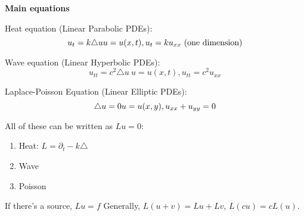 \documentclass[main.tex]{subfiles}
\begin{document}
\textbf{Main equations}

Heat equation (Linear Parabolic PDEs):
\begin{equation}
    \label{eq:heat}
    u_t = k\triangle u \\
    u = u(x, t), u_t = ku_{xx} \textrm{ (one dimension)}
\end{equation}

Wave equation (Linear Hyperbolic PDEs):
\begin{equation}
   \label{eq:wave}
   u_{tt} = c^2\triangle u \
   u = u(x, t), u_{tt} = c^2u_{xx}
\end{equation}

Laplace-Poisson Equation (Linear Elliptic PDEs):
\begin{equation}
   \label{eq:laplace-poisson}
   \triangle u = 0 \\
   u = u(x, y), u_{xx} + u_{yy} = 0
\end{equation}

All of these can be written as $Lu = 0$:
\begin{enumerate}
    \item Heat: $L = \partial_t - k\triangle$
    \item Wave
    \item Poisson
\end{enumerate}
If there's a source, $Lu = f$
Generally, $L(u + v) = Lu + Lv$, $L(cu) = cL(u)$.
\end{document}
